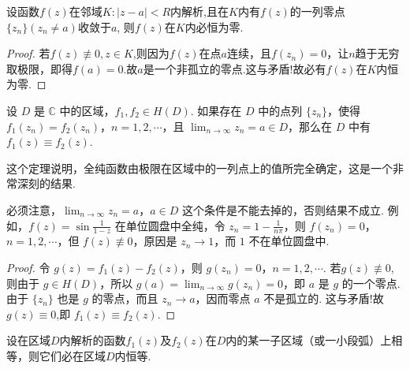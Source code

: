\documentclass[../../main.tex]{subfiles}%
\begin{document}
\begin{corollary}\label{corollary:复变函数---推论4.20}
设函数$f(z)$在邻域$K:|z-a|<R$内解析,且在$K$内有$f(z)$的一列零点$\{z_n\}(z_n\neq a)$收敛于$a$,
则$f(z)$在$K$内必恒为零.
\end{corollary}
\begin{proof}

若$f(z)\not\equiv 0,z\in K$,则因为$f(z)$在点$a$连续，且$f(z_n)=0$，让$n$趋于无穷取极限，即得$f(a)=0$.故$a$是一个非孤立的零点.这与矛盾!故必有$f(z)$在$K$内恒为零.

\end{proof}

\begin{theorem}[唯一性定理]\label{theorem:定理4.3.7}
设 \( D \) 是 \( \mathbb{C} \) 中的区域，\( f_1, f_2 \in H(D) \). 如果存在 \( D \) 中的点列 \( \{ z_n \} \)，使得 \( f_1(z_n) = f_2(z_n) \)，\( n = 1, 2, \cdots \)，且 \( \lim_{n \to \infty} z_n = a \in D \)，那么在 \( D \) 中有 \( f_1(z) \equiv f_2(z) \).
\end{theorem}
\begin{remark}
这个定理说明，全纯函数由极限在区域中的一列点上的值所完全确定，这是一个非常深刻的结果.
\end{remark}
\begin{remark}
必须注意，\(\lim_{n \to \infty} z_n = a\)，\(a \in D\) 这个条件是不能去掉的，否则结果不成立. 例如，\(f(z) = \sin \frac{1}{1 - z}\) 在单位圆盘中全纯，令 \(z_n = 1 - \frac{1}{n\pi}\)，则 \(f(z_n) = 0\)，\(n = 1, 2, \cdots\)，但 \(f(z) \not\equiv 0\)，原因是 \(z_n \to 1\)，而 \(1\) 不在单位圆盘中.
\end{remark}
\begin{proof}

令 \( g(z) = f_1(z) - f_2(z) \)，则 \( g(z_n) = 0 \)，\( n = 1, 2, \cdots \). 若$g(z)\not\equiv 0 $,则由于 \( g \in H(D) \)，所以 \( g(a) = \lim_{n \to \infty} g(z_n) = 0 \)，即 \( a \) 是 \( g \) 的一个零点. 由于 \( \{ z_n \} \) 也是 \( g \) 的零点，而且 \( z_n \to a \)，因而零点 \( a \) 不是孤立的. 这与矛盾!故$g(z)\equiv 0$,即 \( f_1(z) \equiv f_2(z) \).

\end{proof}

\begin{corollary}\label{corollary:复变函数--推论4.22}
设在区域$D$内解析的函数$f_1(z)$及$f_2(z)$在$D$内的某一子区域（或一小段弧）上相等，则它们必在区域$D$内恒等.
\end{corollary}
\end{document}

